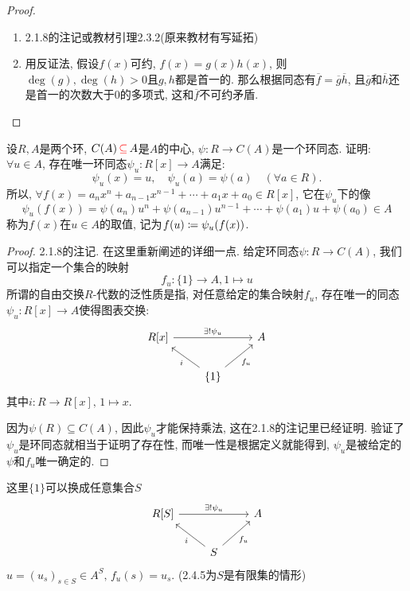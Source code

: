 \documentclass{../solutions-cn}
\begin{document}
\begin{proof}
    \begin{enumerate}[(1)]
        \item 2.1.8的注记或教材引理2.3.2(原来教材有写延拓)
        \item 用反证法, 假设$f(x)$可约, $f(x) = g(x)h(x)$, 则$\deg(g), \deg(h) > 0$且$g, h$都是首一的. 那么根据同态有$\overline{f} = \overline{g}\overline{h}$, 且$\overline{g}$和$\overline{h}$还是首一的次数大于$0$的多项式, 这和$\overline{f}$不可约矛盾.
    \end{enumerate}
\end{proof}

\begin{exercise}[习题2.3.7]
    设$R, A$是两个环, $C(A) \,\textcolor{red}{\subseteq}\, A$是$A$的中心, $\psi:R \to C(A)$是一个环同态. 证明: $\forall u \in A$, 存在唯一环同态$\psi_u:R[x] \to A$满足: 
    \[
        \psi_u(x) = u,\quad \psi_u(a) = \psi(a) \quad (\forall a \in R).
    \]
    所以, $\forall f(x) = a_nx^n + a_{n - 1}x^{n - 1} + \cdots + a_1x + a_0 \in R[x]$, 它在$\psi_u$下的像
    \[
        \psi_u(f(x)) = \psi(a_n)u^n + \psi(a_{n - 1})u^{n - 1} + \cdots + \psi(a_1)u + \psi(a_0) \in A
    \]
    称为$f(x)$在$u \in A$的取值, 记为$f(u) \mathrel{\coloneqq} \psi_u(f(x))$.
\end{exercise}

\begin{proof}
    2.1.8的注记. 在这里重新阐述的详细一点. 给定环同态$\psi:R \to C(A)$, 我们可以指定一个集合的映射
    \[
        f_u:\{1\} \to A, 1 \mapsto u
    \]
    所谓的自由交换$R$-代数的泛性质是指, 对任意给定的集合映射$f_u$, 存在唯一的同态$\psi_u:R[x] \to A$使得图表交换:
    \[
        \begin{tikzcd}
            {R[x]} \arrow[rr, "\exists!\psi_u"] &                                          & A \\
                                                & \{1\} \arrow[lu, "i"] \arrow[ru, "f_u"'] &  
        \end{tikzcd}
    \]
    其中$i:R \to R[x],\, 1 \mapsto x$.

    因为$\psi(R) \subseteq C(A)$, 因此$\psi_u$才能保持乘法, 这在2.1.8的注记里已经证明. 验证了$\psi_u$是环同态就相当于证明了存在性, 而唯一性是根据定义就能得到, $\psi_u$是被给定的$\psi$和$f_u$唯一确定的.
\end{proof}

\begin{remark}
    这里$\{1\}$可以换成任意集合$S$
    \[
        \begin{tikzcd}
        {R[S]} \arrow[rr, "\exists!\psi_u"] &                                      & A \\
                                            & S \arrow[lu, "i"] \arrow[ru, "f_u"'] &  
        \end{tikzcd}
    \]
    $u = (u_s)_{s \in S} \in A^S,\, f_u(s) = u_s$. (2.4.5为$S$是有限集的情形)
\end{remark}
\end{document}
